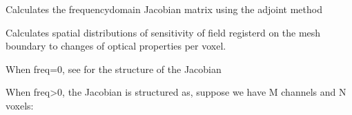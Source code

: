 \documentclass[letterpaper,10pt,english]{sphinxmanual}
\begin{document}
\begin{fulllineitems}
\label{\detokenize{_autosummary/nirfasterff.inverse.jacobian_stnd_FD:nirfasterff.inverse.jacobian_stnd_FD}}
\pysigstartsignatures
\pysiglinewithargsret
{}
{\sphinxparamcomma {}\sphinxparamcomma {}\sphinxparamcomma {}\sphinxparamcomma {}\sphinxparamcomma {}}
{}
\pysigstopsignatures
\sphinxAtStartPar
Calculates the frequency\sphinxhyphen{}domain Jacobian matrix using the adjoint method

\sphinxAtStartPar
Calculates spatial distributions of sensitivity of field registerd on the mesh boundary to changes of optical properties per voxel.

\sphinxAtStartPar
When freq=0, see {\hyperref[\detokenize{_autosummary/nirfasterff.inverse.jacobian_stnd_CW:nirfasterff.inverse.jacobian_stnd_CW}]{}} for the structure of the Jacobian

\sphinxAtStartPar
When freq\textgreater{}0, the Jacobian is structured as, suppose we have M channels and N voxels:


\end{fulllineitems}
\end{document}
